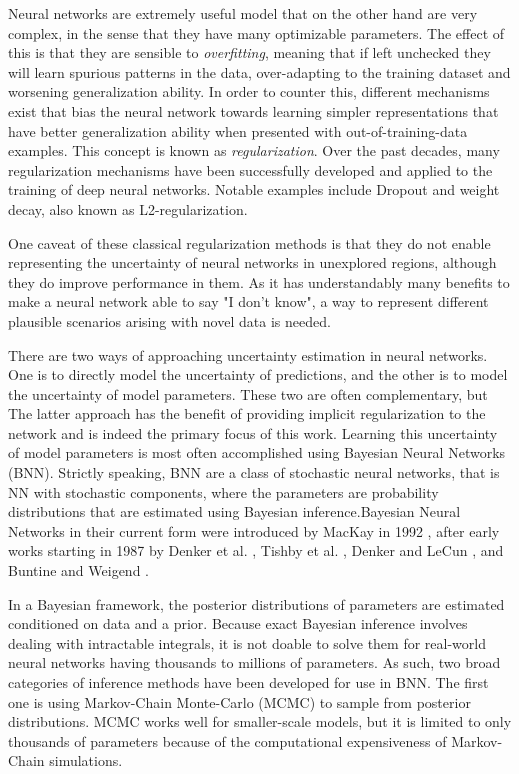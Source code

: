 	Neural networks are extremely useful model that on the other hand are very complex, in the sense that they have many optimizable parameters. The effect of this is that they are sensible to \textit{overfitting}, meaning that if left unchecked they will learn spurious patterns in the data, over-adapting to the training dataset and worsening generalization ability. In order to counter this, different mechanisms exist that bias the neural network towards learning simpler representations that have better generalization ability when presented with out-of-training-data examples. This concept is known as \textit{regularization}. Over the past decades, many regularization mechanisms have been successfully developed and applied to the training of deep neural networks. Notable examples include Dropout and weight decay, also known as L2-regularization.  
	
	One caveat of these classical regularization methods is that they do not enable representing the uncertainty of neural networks in unexplored regions, although they do improve performance in them. As it has understandably many benefits to make a neural network able to say "I don't know", a way to represent different plausible scenarios arising with novel data is needed. 
	
	There are two ways of approaching uncertainty estimation in neural networks. One is to directly model the uncertainty of predictions, and the other is to model the uncertainty of model parameters. These two are often complementary, but The latter approach has the benefit of providing implicit regularization to the network and is indeed the primary focus of this work. Learning this uncertainty of model parameters is most often accomplished using Bayesian Neural Networks (BNN). Strictly speaking, BNN are a class of stochastic neural networks, that is NN with stochastic components, where the parameters are probability distributions that are estimated using Bayesian inference.Bayesian Neural Networks in their current form were introduced by MacKay in 1992 \cite{mackay1992practical}, after early works starting in 1987 by Denker et al. \cite{denker1987large}, Tishby et al. \cite{tishby_consistent_1989}, Denker and LeCun \cite{denker_transforming_1990}, and Buntine and Weigend \cite{buntine1991bayesian}. 
	
	In a Bayesian framework, the posterior distributions of parameters are estimated conditioned on data and a prior. Because exact Bayesian inference involves dealing with intractable integrals, it is not doable to solve them for real-world neural networks having thousands to millions of parameters. As such, two broad categories of inference methods have been developed for use in BNN. The first one is using Markov-Chain Monte-Carlo (MCMC) to sample from posterior distributions. MCMC works well for smaller-scale models, but it is limited to only thousands of parameters because of the computational expensiveness of Markov-Chain simulations. 
	
